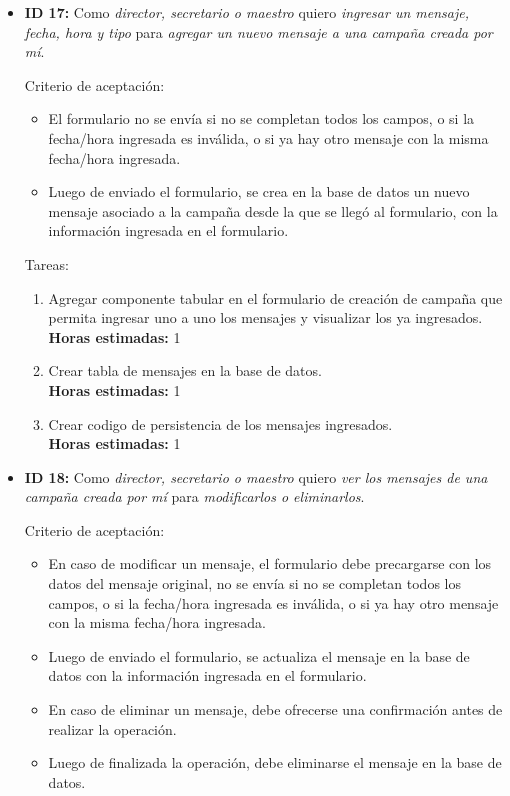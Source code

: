\documentclass[a4paper, 10pt, twoside]{article}
\newenvironment{stories}{
  \begin{itemize}
}{
  \end{itemize}
}
\newcommand{\storyid}[4]{
  \item
  \textbf{ID #1:} Como \emph{#2} quiero \emph{#3} para \emph{#4}.
}
\newenvironment{tasks}{
  Tareas:
  \begin{enumerate}
}{
  \end{enumerate}
}
\newcommand{\task}[1] {
  \item #1.\\
  \textbf{Horas estimadas:}
}
\newenvironment{criterios}{
  Criterio de aceptación:
  \begin{itemize}
}{
  \end{itemize}
}
\newcommand{\criteria}[1] {
  \item #1
}
\begin{document}
\begin{stories}
  \begin{tasks}
    \task{Agregar componente en el formulario de creación de campaña para seleccionar los destinatarios de la misma} 0.5
    \task{Crear tablas de relación entre las campañas y los distintos tipos de destinatarios} 1
    \task{Crear código de persistencia para la lista de destinatarios de la campaña} 1
  \end{tasks}


  \storyid{17}{director, secretario o maestro}
              {ingresar un mensaje, fecha, hora y tipo}
              {agregar un nuevo mensaje a una campaña creada por mí}

  \begin{criterios}
    \criteria{El formulario no se envía si no se completan todos los campos, o si la fecha/hora ingresada es inválida, o si ya hay otro mensaje con la misma fecha/hora ingresada.}
    \criteria{Luego de enviado el formulario, se crea en la base de datos un nuevo mensaje asociado a la campaña desde la que se llegó al formulario, con la información ingresada en el formulario.}
  \end{criterios}

  \begin{tasks}
    \task{Agregar componente tabular en el formulario de creación de campaña que permita ingresar uno a uno los mensajes y visualizar los ya ingresados} 1
    \task{Crear tabla de mensajes en la base de datos} 1
    \task{Crear codigo de persistencia de los mensajes ingresados} 1
  \end{tasks}


  \storyid{18}
          {director, secretario o maestro}
          {ver los mensajes de una campaña creada por mí}
          {modificarlos o eliminarlos}

   \begin{criterios}
    \criteria{En caso de modificar un mensaje, el formulario debe precargarse con los datos del mensaje original, no se envía si no se completan todos los campos, o si la fecha/hora ingresada es inválida, o si ya hay otro mensaje con la misma fecha/hora ingresada.}
    \criteria{Luego de enviado el formulario, se actualiza el mensaje en la base de datos con la información ingresada en el formulario.}
    \criteria{En caso de eliminar un mensaje, debe ofrecerse una confirmación antes de realizar la operación.}
    \criteria{Luego de finalizada la operación, debe eliminarse el mensaje en la base de datos.}
  \end{criterios}


\end{stories}
\end{document}
